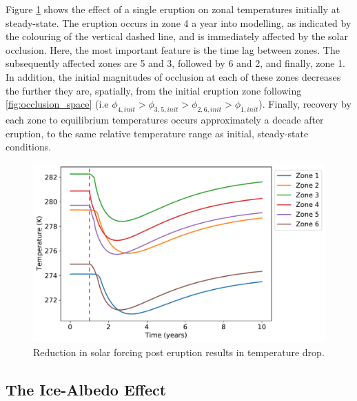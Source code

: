 \documentclass[12pt]{article}
\begin{document}
Figure \ref{fig:oneerupt} shows the effect of a single eruption on zonal 
temperatures initially at steady-state. The eruption occurs in zone 4 a year into
modelling, as indicated by the colouring of the vertical dashed line, and is 
immediately affected by the solar occlusion. Here, the most important feature is 
the time lag between zones. The subsequently affected zones are 5 and 3, followed 
by 6 and 2, and finally, zone 1. In addition, the initial magnitudes of occlusion 
at each of these zones decreases the further they are, spatially, from the 
initial eruption zone following \ref{fig:occlusion_space}
(i.e $\phi_{4,init} > \phi_{3,5,init} > \phi_{2,6,init} > \phi_{1,init}$).
Finally, recovery by each zone to equilibrium temperatures occurs approximately 
a decade after eruption, to the same relative temperature range as initial, 
steady-state conditions.

\begin{figure}[H]
    \centering
    \includegraphics[scale=0.6]{one_eruption.pdf}
    \caption{
        Reduction in solar forcing post eruption results in temperature drop.
    }
    \label{fig:oneerupt}
\end{figure}
\FloatBarrier

\subsection{The Ice-Albedo Effect}
\end{document}
